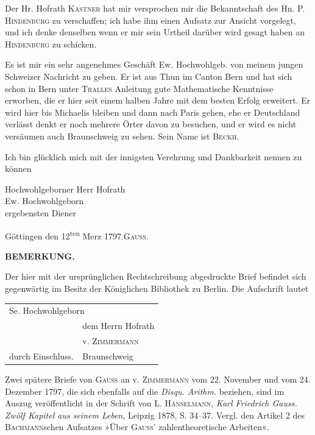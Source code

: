 Der Hr. Hofrath \textsc{Kästner} hat mir versprochen mir die Bekanntschaft des Hn. P. \textsc{Hindenburg} zu verschaffen; ich habe ihm einen Aufsatz zur Ansicht vorgelegt, und ich denke denselben wenn er mir sein Urtheil darüber wird gesagt haben an \textsc{Hindenburg} zu schicken.
\clearpage
{}\par\indent Es ist mir ein sehr angenehmes Geschäft Ew. Hochwohlgeb. von meinem jungen Schweizer Nachricht zu geben. Er ist aus Thun im Canton Bern und hat sich schon in Bern unter \textsc{Tralles} Anleitung gute Mathematische Kenntnisse erworben, die er hier seit einem halben Jahre mit dem besten Erfolg erweitert. Er wird hier bis Michaelis bleiben und dann nach Paris gehen, ehe er Deutschland verlässt denkt er noch mehrere Örter davon zu besuchen, und er wird es nicht versäumen auch Braunschweig zu sehen. Sein Name ist \textsc{Beckh}.

Ich bin glücklich mich mit der innigsten Verehrung und Dankbarkeit nennen zu können
\begin{flushright}
Hochwohlgeborner Herr Hofrath\\[.4em]
Ew. Hochwohlgeborn\\[.4em]
ergebensten Diener
\end{flushright}
\noindent Göttingen den 12\textsuperscript{ten} Merz 1797.\hfill\textsc{Gauss}.

\bigskip\begin{center}\small\bfseries BEMERKUNG.\end{center}
\begingroup\small\par\indent
Der hier mit der ursprünglichen Rechtschreibung abgedruckte Brief befindet sich gegenwärtig im Besitz der Königlichen Bibliothek zu Berlin. Die Aufschrift lautet
\begin{center}
\begin{tabular}{ll}
\multicolumn{2}{l}{Se. Hochwohlgeborn}\\
&dem Herrn Hofrath\\
&\quad v. \textsc{Zimmermann}\\
durch Einschluss.&\qquad Braunschweig
\end{tabular}
\end{center}
\noindent Zwei spätere Briefe von \textsc{Gauss} an v. \textsc{Zimmermann} vom 22. November und vom 24. Dezember 1797, die sich ebenfalls auf die \textit{Disqu. Arithm.} beziehen, sind im Auszug veröffentlicht in der Schrift von L. \textsc{Hänselmann}, \textit{Karl Friedrich Gauss. Zwölf Kapitel aus seinem Leben}, Leipzig 1878, S. 34--37. Vergl. den Artikel 2 des \textsc{Bachmann}schen Aufsatzes »Über \textsc{Gauss}' zahlentheoretische Arbeiten«.

